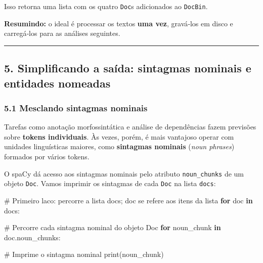 \documentclass[
  brazilian,
  11pt,
]{article}
\newenvironment{Shaded}{\begin{snugshade}}{\end{snugshade}}
\newcommand{\BuiltInTok}[1]{\textcolor[rgb]{0.50,0.55,0.55}{#1}}
\newcommand{\CommentTok}[1]{\textcolor[rgb]{0.48,0.49,0.49}{#1}}
\newcommand{\ControlFlowTok}[1]{\textcolor[rgb]{0.99,0.74,0.29}{\textbf{#1}}}
\newcommand{\KeywordTok}[1]{\textcolor[rgb]{0.81,0.81,0.76}{\textbf{#1}}}
\newcommand{\NormalTok}[1]{\textcolor[rgb]{0.81,0.81,0.76}{#1}}
\let\oldtexttt\texttt
\renewcommand{\texttt}[1]{{\color{inlink}\oldtexttt{#1}}}
\begin{document}
Isso retorna uma lista com os quatro \texttt{Doc}s adicionados ao
\texttt{DocBin}.

\begin{tipbox}

\textbf{Resumindo:} o ideal é processar os textos \textbf{uma vez},
gravá‑los em disco e carregá‑los para as análises seguintes.

\end{tipbox}

\begin{center}\rule{0.5\linewidth}{0.5pt}\end{center}

\subsection{5. Simplificando a saída: sintagmas nominais e entidades
nomeadas}\label{simplificando-a-sauxedda-sintagmas-nominais-e-entidades-nomeadas}

\subsubsection{5.1 Mesclando sintagmas
nominais}\label{mesclando-sintagmas-nominais}

Tarefas como anotação morfossintática e análise de dependências fazem
previsões sobre \textbf{tokens individuais}. Às vezes, porém, é mais
vantajoso operar com unidades linguísticas maiores, como
\textbf{sintagmas nominais} (\emph{noun phrases}) formados por vários
tokens.

O spaCy dá acesso aos sintagmas nominais pelo atributo
\texttt{noun\_chunks} de um objeto \texttt{Doc}. Vamos imprimir os
sintagmas de cada \texttt{Doc} na lista \texttt{docs}:

\begin{Shaded}
\begin{Highlighting}[]
\CommentTok{\# Primeiro laco: percorre a lista \textquotesingle{}docs\textquotesingle{}; \textquotesingle{}doc\textquotesingle{} se refere aos itens da lista}
\ControlFlowTok{for}\NormalTok{ doc }\KeywordTok{in}\NormalTok{ docs:}

    \CommentTok{\# Percorre cada sintagma nominal do objeto Doc}
    \ControlFlowTok{for}\NormalTok{ noun\_chunk }\KeywordTok{in}\NormalTok{ doc.noun\_chunks:}

        \CommentTok{\# Imprime o sintagma nominal}
        \BuiltInTok{print}\NormalTok{(noun\_chunk)}
\end{Highlighting}
\end{Shaded}
\end{document}
